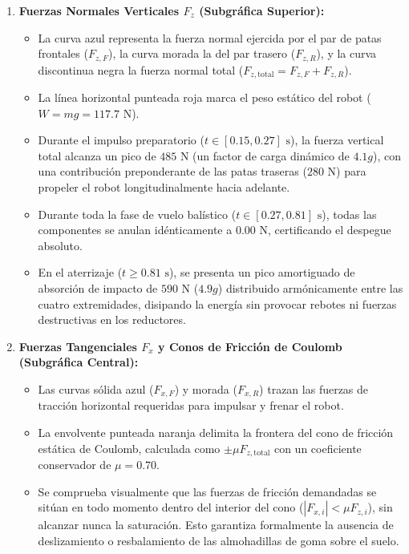 \documentclass[11pt,a4paper]{article}
\begin{document}
\begin{enumerate}
    \item \textbf{Fuerzas Normales Verticales $F_z$ (Subgráfica Superior):}
    \begin{itemize}
        \item La curva azul representa la fuerza normal ejercida por el par de patas frontales ($F_{z,F}$), la curva morada la del par trasero ($F_{z,R}$), y la curva discontinua negra la fuerza normal total ($F_{z,\text{total}} = F_{z,F} + F_{z,R}$).
        \item La línea horizontal punteada roja marca el peso estático del robot ($W = mg = 117.7\text{ N}$).
        \item Durante el impulso preparatorio ($t \in [0.15, 0.27]\text{ s}$), la fuerza vertical total alcanza un pico de $485\text{ N}$ (un factor de carga dinámico de $4.1g$), con una contribución preponderante de las patas traseras ($280\text{ N}$) para propeler el robot longitudinalmente hacia adelante.
        \item Durante toda la fase de vuelo balístico ($t \in [0.27, 0.81]\text{ s}$), todas las componentes se anulan idénticamente a $0.00\text{ N}$, certificando el despegue absoluto.
        \item En el aterrizaje ($t \ge 0.81\text{ s}$), se presenta un pico amortiguado de absorción de impacto de $590\text{ N}$ ($4.9g$) distribuido armónicamente entre las cuatro extremidades, disipando la energía sin provocar rebotes ni fuerzas destructivas en los reductores.
    \end{itemize}

    \item \textbf{Fuerzas Tangenciales $F_x$ y Conos de Fricción de Coulomb (Subgráfica Central):}
    \begin{itemize}
        \item Las curvas sólida azul ($F_{x,F}$) y morada ($F_{x,R}$) trazan las fuerzas de tracción horizontal requeridas para impulsar y frenar el robot.
        \item La envolvente punteada naranja delimita la frontera del cono de fricción estática de Coulomb, calculada como $\pm \mu F_{z,\text{total}}$ con un coeficiente conservador de $\mu = 0.70$.
        \item Se comprueba visualmente que las fuerzas de fricción demandadas se sitúan en todo momento dentro del interior del cono ($|F_{x,i}| < \mu F_{z,i}$), sin alcanzar nunca la saturación. Esto garantiza formalmente la ausencia de deslizamiento o resbalamiento de las almohadillas de goma sobre el suelo.
    \end{itemize}


\end{enumerate}
\end{document}
